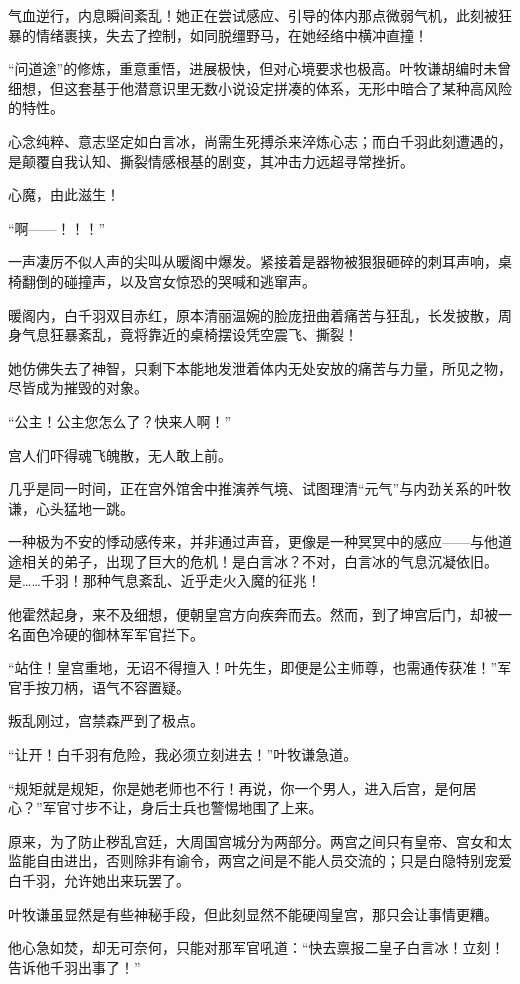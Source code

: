 气血逆行，内息瞬间紊乱！她正在尝试感应、引导的体内那点微弱气机，此刻被狂暴的情绪裹挟，失去了控制，如同脱缰野马，在她经络中横冲直撞！

“问道途”的修炼，重意重悟，进展极快，但对心境要求也极高。叶牧谦胡编时未曾细想，但这套基于他潜意识里无数小说设定拼凑的体系，无形中暗合了某种高风险的特性。

心念纯粹、意志坚定如白言冰，尚需生死搏杀来淬炼心志；而白千羽此刻遭遇的，是颠覆自我认知、撕裂情感根基的剧变，其冲击力远超寻常挫折。

心魔，由此滋生！

“啊——！！！”

一声凄厉不似人声的尖叫从暖阁中爆发。紧接着是器物被狠狠砸碎的刺耳声响，桌椅翻倒的碰撞声，以及宫女惊恐的哭喊和逃窜声。

暖阁内，白千羽双目赤红，原本清丽温婉的脸庞扭曲着痛苦与狂乱，长发披散，周身气息狂暴紊乱，竟将靠近的桌椅摆设凭空震飞、撕裂！

她仿佛失去了神智，只剩下本能地发泄着体内无处安放的痛苦与力量，所见之物，尽皆成为摧毁的对象。

“公主！公主您怎么了？快来人啊！”

宫人们吓得魂飞魄散，无人敢上前。

几乎是同一时间，正在宫外馆舍中推演养气境、试图理清“元气”与内劲关系的叶牧谦，心头猛地一跳。

一种极为不安的悸动感传来，并非通过声音，更像是一种冥冥中的感应——与他道途相关的弟子，出现了巨大的危机！是白言冰？不对，白言冰的气息沉凝依旧。是……千羽！那种气息紊乱、近乎走火入魔的征兆！

他霍然起身，来不及细想，便朝皇宫方向疾奔而去。然而，到了坤宫后门，却被一名面色冷硬的御林军军官拦下。

“站住！皇宫重地，无诏不得擅入！叶先生，即便是公主师尊，也需通传获准！”军官手按刀柄，语气不容置疑。

叛乱刚过，宫禁森严到了极点。

“让开！白千羽有危险，我必须立刻进去！”叶牧谦急道。

“规矩就是规矩，你是她老师也不行！再说，你一个男人，进入后宫，是何居心？”军官寸步不让，身后士兵也警惕地围了上来。

原来，为了防止秽乱宫廷，大周国宫城分为两部分。两宫之间只有皇帝、宫女和太监能自由进出，否则除非有谕令，两宫之间是不能人员交流的；只是白隐特别宠爱白千羽，允许她出来玩罢了。

叶牧谦虽显然是有些神秘手段，但此刻显然不能硬闯皇宫，那只会让事情更糟。

他心急如焚，却无可奈何，只能对那军官吼道：“快去禀报二皇子白言冰！立刻！告诉他千羽出事了！”


